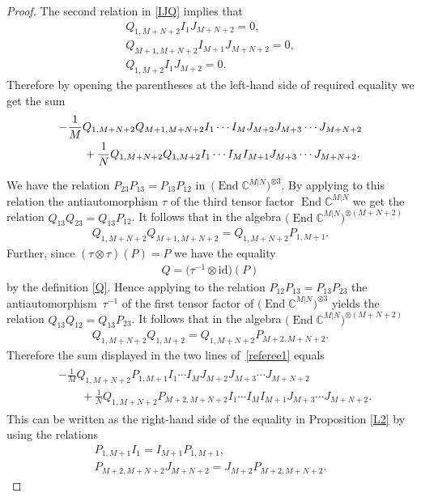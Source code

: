 \documentclass[pdftex]{sigma}
\numberwithin{equation}{section}
\def\1{^{-1}}
\def\CC{{\mathbb{C}}}
\def\CMN{\CC^{M|N}}
\def\End{\operatorname{End}}
\def\id{{\mathrm{id}}}
\def\ot{\otimes}
\begin{document}
\begin{proof}
The second relation in \eqref{IJQ} implies that
\begin{gather*}
Q_{1,M+N+2} I_{1} J_{M+N+2}=0 ,\\
Q_{M+1,M+N+2} I_{M+1}J_{M+N+2}=0 ,\\
Q_{1,M+2} I_{1} J_{M+2}=0 .
\end{gather*}
Therefore by opening the parentheses at the left-hand side of
required equality we get the sum
\begin{gather}
\notag
- \frac1M Q_{1,M+N+2} Q_{M+1,M+N+2}
I_{1} \cdots I_{M}
J_{M+2}
J_{M+3} \cdots J_{M+N+2}\\
\label{referee1}
\qquad{} + \frac1N
Q_{1,M+N+2} Q_{1,M+2}
I_{1} \cdots I_{M}
I_{M+1}
J_{M+3} \cdots J_{M+N+2} .
\end{gather}

We have the relation
$P_{23} P_{13}=P_{13} P_{12}$ in~$\big(\End\CMN\big)^{\ot3} $.
By applying to this relation the antiautomorphism $\tau$
of the third tensor factor $\End\CMN$ we get the relation
$Q_{13} Q_{23}=Q_{13} P_{12} $.
It follows that in the algebra $\big(\End\CMN\big)^{\ot (M+N+2)}$
\begin{gather}\label{QQP}
Q_{1,M+N+2} Q_{M+1,M+N+2}=Q_{1,M+N+2} P_{1,M+1} .
\end{gather}
Further, since $(\tau\ot\tau)(P)=P$ we have the equality
\begin{gather*}
Q=\big( \tau\1\ot\id \big) ( P )
\end{gather*}
by the definition \eqref{Q}.
Hence applying to the relation $P_{12} P_{13}=P_{13} P_{23}$
the antiautomorphism~$\tau\1$ of the first tensor factor of
$\big(\End\CMN\big)^{\ot3}$ yields the relation
$Q_{13} Q_{12}=Q_{13} P_{23} $.
It follows that in the algebra $\big(\End\CMN\big)^{\ot (M+N+2)}$
\begin{gather}\label{QQQ}
Q_{1,M+N+2} Q_{1,M+2}=Q_{1,M+N+2} P_{M+2,M+N+2} .
\end{gather}
Therefore the sum displayed in the two lines of~\eqref{referee1} equals
\begin{gather*}
\begin{split} &
- \frac1M Q_{1,M+N+2} P_{1,M+1}I_{1} \cdots I_{M}
J_{M+2}J_{M+3} \cdots J_{M+N+2}\\
& \qquad {} + \frac1N
Q_{1,M+N+2} P_{M+2,M+N+2}I_{1} \cdots I_{M}I_{M+1}J_{M+3} \cdots J_{M+N+2} .
\end{split}
\end{gather*}
This can be written as the right-hand side of the equality in
Proposition \ref{L2} by using the relations
\begin{gather*}
P_{1,M+1} I_{1}=I_{M+1} P_{1,M+1} ,\\
P_{M+2,M+N+2} J_{M+N+2}=J_{M+2} P_{M+2,M+N+2} .\tag*{\qed}
\end{gather*}
\renewcommand{\qed}{}
\end{proof}
\end{document}
